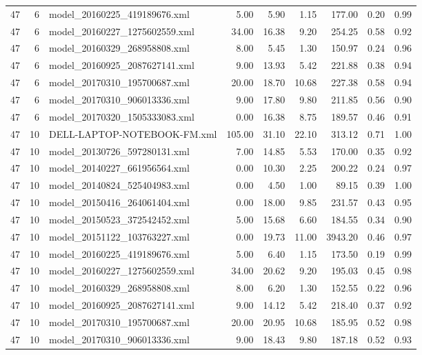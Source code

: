 \begin{table}[ht]
\begin{tabular}{rrlrrrrrr}
   47 &   6 & model\_20160225\_419189676.xml & 5.00 & 5.90 & 1.15 & 177.00 & 0.20 & 0.99 \\ 
   47 &   6 & model\_20160227\_1275602559.xml & 34.00 & 16.38 & 9.20 & 254.25 & 0.58 & 0.92 \\ 
   47 &   6 & model\_20160329\_268958808.xml & 8.00 & 5.45 & 1.30 & 150.97 & 0.24 & 0.96 \\ 
   47 &   6 & model\_20160925\_2087627141.xml & 9.00 & 13.93 & 5.42 & 221.88 & 0.38 & 0.94 \\ 
   47 &   6 & model\_20170310\_195700687.xml & 20.00 & 18.70 & 10.68 & 227.38 & 0.58 & 0.94 \\ 
   47 &   6 & model\_20170310\_906013336.xml & 9.00 & 17.80 & 9.80 & 211.85 & 0.56 & 0.90 \\ 
   47 &   6 & model\_20170320\_1505333083.xml & 0.00 & 16.38 & 8.75 & 189.57 & 0.46 & 0.91 \\ 
   47 &  10 & DELL-LAPTOP-NOTEBOOK-FM.xml & 105.00 & 31.10 & 22.10 & 313.12 & 0.71 & 1.00 \\ 
   47 &  10 & model\_20130726\_597280131.xml & 7.00 & 14.85 & 5.53 & 170.00 & 0.35 & 0.92 \\ 
   47 &  10 & model\_20140227\_661956564.xml & 0.00 & 10.30 & 2.25 & 200.22 & 0.24 & 0.97 \\ 
   47 &  10 & model\_20140824\_525404983.xml & 0.00 & 4.50 & 1.00 & 89.15 & 0.39 & 1.00 \\ 
   47 &  10 & model\_20150416\_264061404.xml & 0.00 & 18.00 & 9.85 & 231.57 & 0.43 & 0.95 \\ 
   47 &  10 & model\_20150523\_372542452.xml & 5.00 & 15.68 & 6.60 & 184.55 & 0.34 & 0.90 \\ 
   47 &  10 & model\_20151122\_103763227.xml & 0.00 & 19.73 & 11.00 & 3943.20 & 0.46 & 0.97 \\ 
   47 &  10 & model\_20160225\_419189676.xml & 5.00 & 6.40 & 1.15 & 173.50 & 0.19 & 0.99 \\ 
   47 &  10 & model\_20160227\_1275602559.xml & 34.00 & 20.62 & 9.20 & 195.03 & 0.45 & 0.98 \\ 
   47 &  10 & model\_20160329\_268958808.xml & 8.00 & 6.20 & 1.30 & 152.55 & 0.22 & 0.96 \\ 
   47 &  10 & model\_20160925\_2087627141.xml & 9.00 & 14.12 & 5.42 & 218.40 & 0.37 & 0.92 \\ 
   47 &  10 & model\_20170310\_195700687.xml & 20.00 & 20.95 & 10.68 & 185.95 & 0.52 & 0.98 \\ 
   47 &  10 & model\_20170310\_906013336.xml & 9.00 & 18.43 & 9.80 & 187.18 & 0.52 & 0.93 \\ 

\end{tabular}
\end{table}
